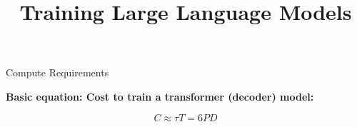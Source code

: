 



\newcommand{\learninggoals}{
\item Learn about different contributions to compute requirements
\item Learn how model size components influence memory requirements
}
\def\myblue#1{\textcolor{texblue}{#1}}

\title{Training Large Language Models}
\date{}







\begin{vbframe}{Compute Requirements}

\vfill

\textbf{Basic equation: Cost to train a transformer (decoder) model:}

\vspace{1.5cm}

$$C \approx \tau T = 6 P D$$ 

\vspace{1.5cm}

\centering {}

\vfill

\end{vbframe}


